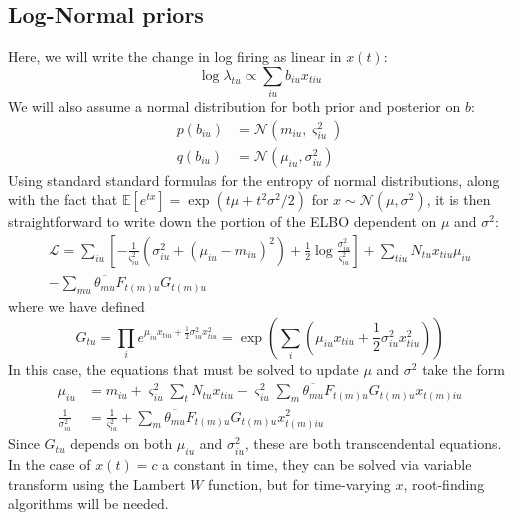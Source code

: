 \documentclass[11pt]{article}
\begin{document}
\subsection{Log-Normal priors}
Here, we will write the change in log firing as linear in $x(t)$:
\begin{equation}
    \log \lambda_{tu} \propto \sum_{iu} b_{iu} x_{tiu}
\end{equation}
We will also assume a normal distribution for both prior and posterior on $b$:
\begin{align}
    p(b_{iu}) &= \mathcal{N}(m_{iu}, \varsigma^2_{iu}) \\
    q(b_{iu}) &= \mathcal{N}(\mu_{iu}, \sigma^2_{iu})
\end{align}
Using standard standard formulas for the entropy of normal distributions, along with the fact that $\mathbb{E}[e^{tx}] = \exp(t\mu + t^2\sigma^2/2)$ for $x \sim \mathcal{N}(\mu, \sigma^2)$, it is then straightforward to write down the portion of the ELBO dependent on $\mu$ and $\sigma^2$:
\begin{multline}
    \mathcal{L} = \sum_{iu} \left[ -\frac{1}{\varsigma^2_{iu}} \left( \sigma^2_{iu} + (\mu_{iu} - m_{iu})^2 \right) + \frac{1}{2} \log \frac{\sigma^2_{iu}}{\varsigma^2_{iu}} \right] + \sum_{tiu} N_{tu} x_{tiu} \mu_{iu} \\
    - \sum_{mu} \overline{\theta_{mu}} F_{t(m)u} G_{t(m)u}
\end{multline}
where we have defined
\begin{equation}
    G_{tu} = \prod_i e^{\mu_{iu} x_{tiu} + \frac{1}{2} \sigma^2_{iu} x^2_{tiu}} = \exp\left(\sum_i\left( \mu_{iu} x_{tiu} + \frac{1}{2} \sigma^2_{iu} x^2_{tiu}\right)\right)
\end{equation}
In this case, the equations that must be solved to update $\mu$ and $\sigma^2$ take the form
\begin{align}
    \mu_{iu} &= m_{iu} + \varsigma^2_{iu} \sum_t N_{tu} x_{tiu} - \varsigma^2_{iu} \sum_{m} \overline{\theta_{mu}} F_{t(m)u} G_{t(m)u} x_{t(m)iu} \\
    \frac{1}{\sigma^2_{iu}} &= \frac{1}{\varsigma^2_{iu}} + \sum_{m} \overline{\theta_{mu}} F_{t(m)u} G_{t(m)u} x^2_{t(m)iu}
\end{align}
Since $G_{tu}$ depends on both $\mu_{iu}$ and $\sigma^2_{iu}$, these are both transcendental equations. In the case of $x(t) = c$ a constant in time, they can be solved via variable transform using the Lambert $W$ function, but for time-varying $x$, root-finding algorithms will be needed.
\end{document}
